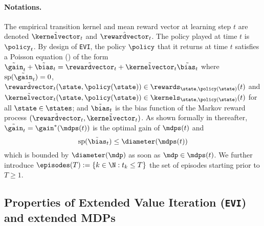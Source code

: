\documentclass[preprint,cleveref,12pt]{colt2025}
\DeclarePairedDelimiter{\braces}{\{}{\}}	%
\DeclarePairedDelimiter{\parens}{(}{)}	%
\newcommand{\vecspan}[1]{\mathrm{sp}\parens{#1}}
\def\model{\mdp}
\def\models{\mdps}
\def\kernel{\kernelvector}
\def\reward{\rewardvector}
\begin{document}
    \paragraph{Notations.}
    The empirical transition kernel and mean reward vector at learning step $t$ are denoted $\hat{\kernel}_t$ and $\hat{\reward}_t$.
    The policy played at time $t$ is $\policy_t$. 
    By design of \texttt{EVI}, the policy $\policy$ that it returns at time $t$ satisfies a Poisson equation () of the form $\tilde{\gain}_t + \tilde{\bias}_t = \tilde{\reward}_t + \tilde{\kernel}_t \tilde{\bias_t}$ where $\vecspan{\tilde{\gain}_t} = 0$, $\tilde{\reward}_t(\state, \policy(\state)) \in \rewards_{\state, \policy(\state)}(t)$ and $\tilde{\kernel}_t(\state, \policy(\state)) \in \kernels_{\state, \policy(\state)}(t)$ for all $\state \in \states$; and $\tilde{\bias}_t$ is the bias function of the Markov reward process $(\tilde{\reward}_t, \tilde{\kernel}_t)$. 
    As shown formally in  thereafter, $\tilde{\gain}_t = \gain^*(\models(t))$ is the optimal gain of $\models(t)$ and
    \begin{equation}
    \label{equation_bias_diameter}
        \vecspan{\tilde{\bias}_t}
        \le
        \diameter(\models(t))
    \end{equation}
    which is bounded by $\diameter(\model)$ as soon as $\model \in \models(t)$. 
    We further introduce $\episodes(T) := \braces{k \in \N: t_k \le T}$ the set of episodes starting prior to $T \ge 1$. 

    \subsection{Properties of Extended Value Iteration (\texttt{EVI}) and extended MDPs}
    \label{appendix_evi}
\end{document}
